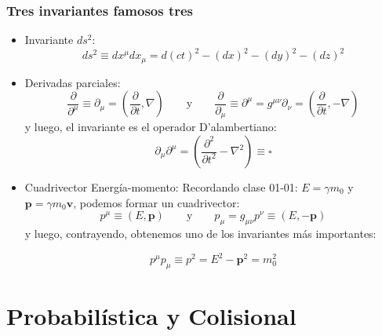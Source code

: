 \documentclass[xetex,mathserif,serif,10pt]{beamer}
\begin{document}
\begin{frame}
  \frametitle{Tres invariantes famosos tres}
  \begin{itemize}
    \item \alert{Invariante $ds^2$}:
      \begin{equation}
        ds^2 \equiv dx^\mu dx_\mu = d(ct)^2 - (dx)^2 - (dy)^2 - (dz)^2
      \end{equation}
    \item \alert{Derivadas parciales}:
      \begin{equation}
        \frac{\partial}{\partial^\mu} \equiv \partial_\mu = \left( \frac{\partial}{\partial t}, \nabla \right)
        \qquad \mathrm{y} \qquad
        \frac{\partial}{\partial_\mu} \equiv \partial^\mu = g^{\mu\nu} \partial_\nu = \left(\frac{\partial}{\partial t}, -\nabla \right)
      \end{equation}
      y luego, el invariante es el operador \alert{D'alambertiano}:
      \begin{equation}
        \partial_\mu \partial^\mu = \left(\frac{\partial^2}{\partial t^2} - \nabla^2 \right) \equiv \square
      \end{equation}
    \item \alert{Cuadrivector Energía-momento}: Recordando clase 01-01: $E=\gamma m_0$ y $\mathbf{p}=\gamma m_0 \mathbf{v}$, podemos formar un cuadrivector:
      \begin{equation}
        p^\mu \equiv (E,\mathbf{p}) \qquad \mathrm{y} \qquad  p_\mu = g_{\mu\nu} p^\nu \equiv (E,-\mathbf{p})
      \end{equation}
      y luego, contrayendo, obtenemos uno de los invariantes más importantes:
      \begin{alertblock}{
          \begin{equation}
            p^\mu p_\mu \equiv p^2 = E^2 -\mathbf{p}^2 = m_0^2
          \end{equation}
      }
    \end{alertblock}
  \end{itemize}
\end{frame}

\section{Probabilística y Colisional}
\end{document}
